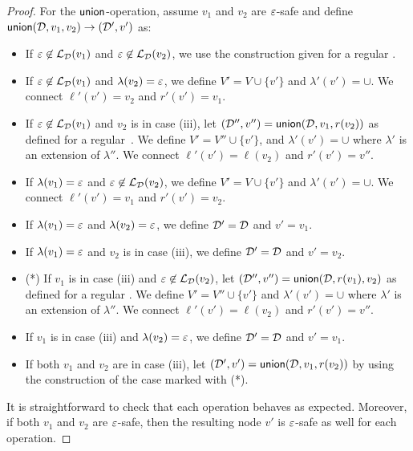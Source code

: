 \begin{proof}
For the $\mathsf{union}$-operation, assume $v_1$ and $v_2$ are $\varepsilon$-safe and
define $\mathsf{union}(\mathcal{D},v_1, v_2) \to (\mathcal{D}',v')$ as:
\begin{itemize}
	\item If $\varepsilon\not\in\mathcal{L}_{\mathcal{D}}(v_1)$ and $\varepsilon\not\in\mathcal{L}_{\mathcal{D}}(v_2)$, we use the construction given for a regular \dsabbr.
	\item If $\varepsilon\not\in\mathcal{L}_{\mathcal{D}}(v_1)$ and $\lambda(v_2) = \varepsilon$, we define $V' = V \cup\{v'\}$ and $\lambda'(v') = \cup$. We connect $\ell'(v') = v_2$ and $r'(v') = v_1$.
	\item If $\varepsilon\not\in\mathcal{L}_{\mathcal{D}}(v_1)$ and $v_2$ is in case (iii), let $(\mathcal{D}'',v'') = \mathsf{union}(\mathcal{D},v_1,r(v_2))$ as defined for a regular~\dsabbr. We define $V' = V'' \cup\{v'\}$, and $\lambda'(v') = \cup$ where $\lambda'$ is an extension of $\lambda''$. We connect $\ell'(v') = \ell(v_2)$ and $r'(v') = v''$.
	\item If $\lambda(v_1) = \varepsilon$ and $\varepsilon\not\in\mathcal{L}_{\mathcal{D}}(v_2)$, we define $V' = V \cup\{v'\}$ and $\lambda'(v') = \cup$. We connect $\ell'(v') = v_1$ and $r'(v') = v_2$.
	\item If $\lambda(v_1) = \varepsilon$ and $\lambda(v_2) = \varepsilon$, we define $\mathcal{D}' = \mathcal{D}$ and $v' = v_1$.
	\item If $\lambda(v_1) = \varepsilon$ and $v_2$ is in case (iii), we define $\mathcal{D}' = \mathcal{D}$ and $v' = v_2$.
	\item (*) If $v_1$ is in case (iii) and $\varepsilon\not\in\mathcal{L}_{\mathcal{D}}(v_2)$, let $(\mathcal{D}'',v'') = \mathsf{union}(\mathcal{D},r(v_1),v_2)$ as defined for a regular \dsabbr.  We define $V' = V'' \cup\{v'\}$ and $\lambda'(v') = \cup$ where $\lambda'$ is an extension of $\lambda''$. We connect $\ell'(v') = \ell(v_2)$ and $r'(v') = v''$. 
	\item If $v_1$ is in case (iii) and $\lambda(v_2) = \varepsilon$, we define $\mathcal{D}' = \mathcal{D}$ and $v' = v_1$.
	\item If both $v_1$ and $v_2$ are in case (iii), let $(\mathcal{D}',v') = \mathsf{union}(\mathcal{D},v_1,r(v_2))$ by using the construction of the case marked with (*).
\end{itemize}
It is straightforward to check that each operation behaves as expected. 
Moreover, if both $v_1$ and $v_2$ are $\varepsilon$-safe, then the resulting node $v'$ is $\varepsilon$-safe as well for each operation.


\end{proof}
